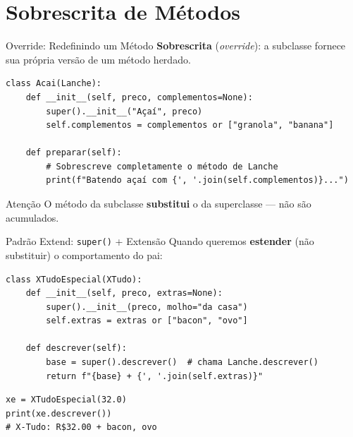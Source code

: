 \documentclass[aspectratio=169]{beamer}
\begin{document}
\section{Sobrescrita de Métodos}

\begin{frame}[fragile]{Override: Redefinindo um Método}
  \textbf{Sobrescrita} (\emph{override}): a subclasse fornece sua própria versão de um método herdado.

  \begin{lstlisting}
class Acai(Lanche):
    def __init__(self, preco, complementos=None):
        super().__init__("Açaí", preco)
        self.complementos = complementos or ["granola", "banana"]

    def preparar(self):
        # Sobrescreve completamente o método de Lanche
        print(f"Batendo açaí com {', '.join(self.complementos)}...")
  \end{lstlisting}

  \begin{alertblock}{Atenção}
    O método da subclasse \textbf{substitui} o da superclasse --- não são acumulados.
  \end{alertblock}
\end{frame}

\begin{frame}[fragile]{Padrão Extend: \texttt{super()} + Extensão}
  Quando queremos \textbf{estender} (não substituir) o comportamento do pai:

  \begin{lstlisting}
class XTudoEspecial(XTudo):
    def __init__(self, preco, extras=None):
        super().__init__(preco, molho="da casa")
        self.extras = extras or ["bacon", "ovo"]

    def descrever(self):
        base = super().descrever()  # chama Lanche.descrever()
        return f"{base} + {', '.join(self.extras)}"
  \end{lstlisting}

  \begin{lstlisting}
xe = XTudoEspecial(32.0)
print(xe.descrever())
# X-Tudo: R$32.00 + bacon, ovo
  \end{lstlisting}
\end{frame}
\end{document}
